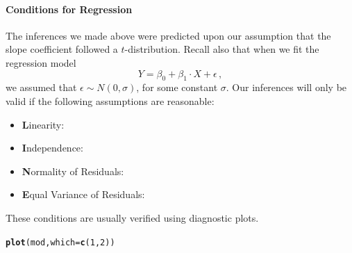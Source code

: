 \documentclass[10pt]{article}\usepackage[]{graphicx}\usepackage[]{color}
\makeatletter
\newcommand{\hlnum}[1]{\textcolor[rgb]{0.686,0.059,0.569}{#1}}%
\newcommand{\hlstd}[1]{\textcolor[rgb]{0.345,0.345,0.345}{#1}}%
\newcommand{\hlkwc}[1]{\textcolor[rgb]{0.333,0.667,0.333}{#1}}%
\newcommand{\hlkwd}[1]{\textcolor[rgb]{0.737,0.353,0.396}{\textbf{#1}}}%
\newenvironment{kframe}{%
 \def\at@end@of@kframe{}%
 \ifinner\ifhmode%
  \def\at@end@of@kframe{\end{minipage}}%
  \begin{minipage}{\columnwidth}%
 \fi\fi%
 \def\FrameCommand##1{\hskip\@totalleftmargin \hskip-\fboxsep
 \colorbox{shadecolor}{##1}\hskip-\fboxsep
     \hskip-\linewidth \hskip-\@totalleftmargin \hskip\columnwidth}%
 \MakeFramed {\advance\hsize-\width
   \@totalleftmargin\z@ \linewidth\hsize
   \@setminipage}}%
 {\par\unskip\endMakeFramed%
 \at@end@of@kframe}
\newenvironment{knitrout}{}{} %
\makeatother
\begin{document}
\paragraph{Conditions for Regression}

The inferences we made above were predicted upon our assumption that the slope coefficient followed a $t$-distribution. Recall also that when we fit the regression model
$$
  Y = \beta_0 + \beta_1 \cdot X + \epsilon \, ,
$$
we assumed that $\epsilon \sim N(0, \sigma)$, for some constant $\sigma$. Our inferences will only be valid if the following assumptions are reasonable: 

\begin{itemize}
  \itemsep0in
  \item \textbf{L}inearity:
  \item \textbf{I}ndependence:
  \item \textbf{N}ormality of Residuals:
  \item \textbf{E}qual Variance of Residuals:
\end{itemize}
\clearpage
These conditions are usually verified using diagnostic plots. 

\begin{knitrout}
\color{fgcolor}\begin{kframe}
\begin{alltt}
\hlkwd{plot}\hlstd{(mod,} \hlkwc{which}\hlstd{=}\hlkwd{c}\hlstd{(}\hlnum{1}\hlstd{,}\hlnum{2}\hlstd{))}
\end{alltt}
\end{kframe}
\end{knitrout}
\end{document}
